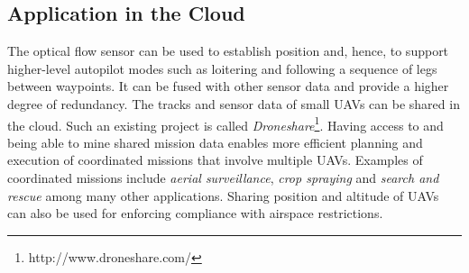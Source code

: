 \documentclass[paper=letter, fontsize=11pt]{scrartcl}
\numberwithin{equation}{section}
\numberwithin{figure}{section}
\numberwithin{table}{section}
\begin{document}
\subsection{Application in the Cloud}
\label{sec:application_cloud}
\par
The optical flow sensor can be used to establish position and, hence, to
support higher-level autopilot modes such as loitering and following a
sequence of legs between waypoints. It can be fused with other sensor data
and provide a higher degree of redundancy. The tracks and sensor data of
small \acp{UAV} can be shared in the cloud. Such an existing project is
called {\em Droneshare}\footnote{http://www.droneshare.com/}. Having access
to and being able to mine shared mission data enables more
efficient planning and execution of coordinated missions that involve
multiple \acp{UAV}. Examples of coordinated missions include {\em aerial
surveillance}, {\em crop spraying} and {\em search and rescue} among many
other applications. Sharing position and altitude of \acp{UAV} can also
be used for enforcing compliance with airspace restrictions.

\clearpage
\label{appendix}


%
%
\end{document}
